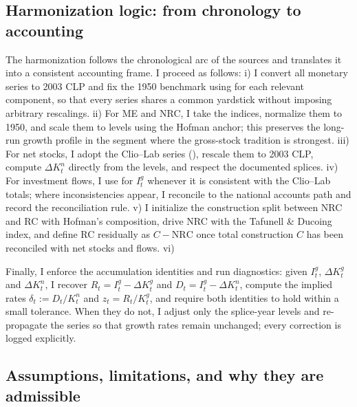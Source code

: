 

\subsection{Harmonization logic: from chronology to accounting}

The harmonization follows the chronological arc of the sources and translates it into a consistent accounting frame. I proceed as follows: i) I convert all monetary series to 2003 CLP and fix the 1950 benchmark using \citet{Hofman2000} for each relevant component, so that every series shares a common yardstick without imposing arbitrary rescalings. ii) For ME and NRC, I take the \citet{Tafunell2016} indices, normalize them to 1950, and scale them to levels using the Hofman anchor; this preserves the long-run growth profile in the segment where the gross-stock tradition is strongest. iii) For net stocks, I adopt the Clio--Lab series (\citealt{Luders2016,Diaz2016}), rescale them to 2003 CLP, compute $\Delta K^n_t$ directly from the levels, and respect the documented splices. iv) For investment flows, I use \citet{PerezEyzaguirre2019} for $I^g_t$ whenever it is consistent with the Clio--Lab totals; where inconsistencies appear, I reconcile to the national accounts path and record the reconciliation rule. v) I initialize the construction split between NRC and RC with Hofman’s composition, drive NRC with the Tafunell \& Ducoing index, and define RC residually as $C - \text{NRC}$ once total construction $C$ has been reconciled with net stocks and flows. vi) 

Finally, I enforce the accumulation identities and run diagnostics: given $I^g_t$, $\Delta K^g_t$ and $\Delta K^n_t$, I recover $R_t = I^g_t - \Delta K^g_t$ and $D_t = I^g_t - \Delta K^n_t$, compute the implied rates $\delta_t := D_t/K^n_t$ and $z_t = R_t/K^g_t$, and require both identities to hold within a small tolerance. When they do not, I adjust only the splice-year levels and re-propagate the series so that growth rates remain unchanged; every correction is logged explicitly.


\subsection{Assumptions, limitations, and why they are admissible}

